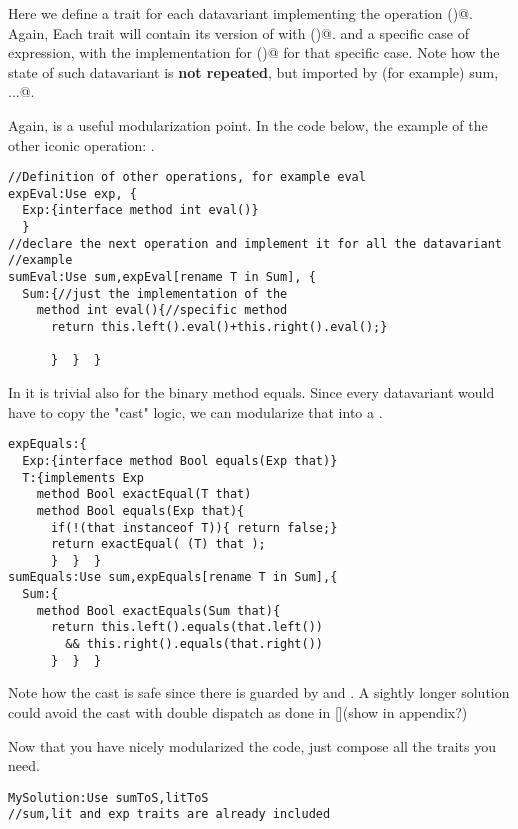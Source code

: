 Here we define a trait for each datavariant implementing the operation \Q@toString()@.
Again, Each trait will contain its version of \Q@Exp@ with \Q@toString()@.
and a specific case of expression, with the implementation for \Q@toString()@
for that specific case. Note how the state of such datavariant is 
\textbf{not repeated}, but imported by (for example) \Q@Use sum, ...@.

Again, \Q@expToS@ is a useful modularization point.
In the code below, the example of the other iconic operation: \Q@eval@.

\begin{lstlisting}
//Definition of other operations, for example eval
expEval:Use exp, {
  Exp:{interface method int eval()}
  }
//declare the next operation and implement it for all the datavariant
//example
sumEval:Use sum,expEval[rename T in Sum], {
  Sum:{//just the implementation of the
    method int eval(){//specific method
      return this.left().eval()+this.right().eval();}

      }  }  }
\end{lstlisting}
In \name it is trivial also for the binary method equals.
Since every datavariant would have to copy the "cast" logic,
 we can modularize that into a \Q@expEquals@.

\begin{lstlisting}
expEquals:{
  Exp:{interface method Bool equals(Exp that)}
  T:{implements Exp
    method Bool exactEqual(T that)
    method Bool equals(Exp that){
      if(!(that instanceof T)){ return false;}
      return exactEqual( (T) that );
      }  }  }
sumEquals:Use sum,expEquals[rename T in Sum],{
  Sum:{
    method Bool exactEquals(Sum that){
      return this.left().equals(that.left()) 
        && this.right().equals(that.right())
      }  }  }
\end{lstlisting}
Note how the cast is safe since there is guarded by
and \Q@instanceof@. A sightly longer solution could avoid the
cast with double dispatch as done in [](show in appendix?)

Now that you have nicely modularized the code, just compose all the traits you need.
\begin{lstlisting}
MySolution:Use sumToS,litToS
//sum,lit and exp traits are already included
\end{lstlisting}

